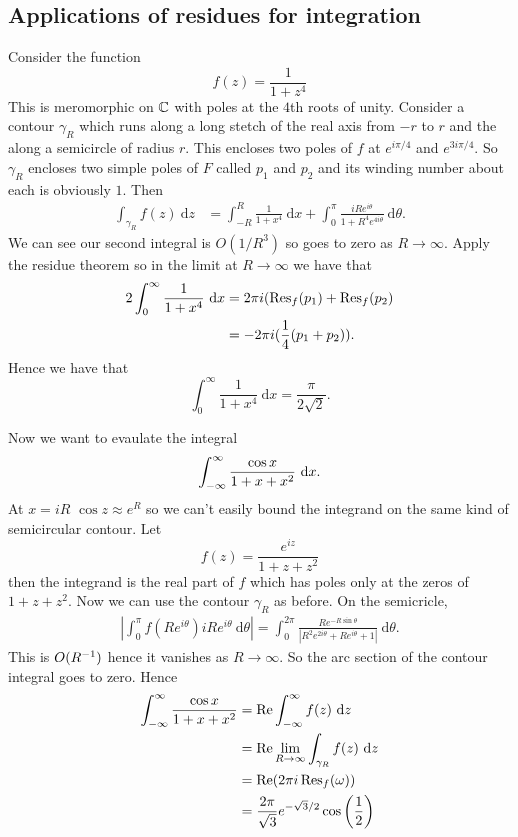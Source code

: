 \documentclass{article}
\begin{document}
\subsection{Applications of residues for integration}
\begin{example}
  Consider the function
  \[
	  f(z) = \frac 1{1+z^4}
  \]
  This is meromorphic on $ \mathbb{C} $ with poles at the $ 4 $th roots of unity. Consider a contour $ \gamma_R $ which runs along a long stetch of the real axis from $ -r $ to $ r $ and the along a semicircle of radius $ r $. This encloses two poles of $ f $ at $ e^{i\pi/4} $ and $ e^{3i\pi/4} $. So $ \gamma_R $ encloses two simple poles of $ F $ called $ p_1 $ and $ p_2 $ and its winding number about each is obviously $ 1 $. Then
  \begin{align*}
	  \int_{\gamma_R} f(z)\ \mathrm dz &= \int_{-R}^R \frac 1{1+x^4}\ \mathrm dx + \int_0^\pi \frac{iRe^{i\theta}}{1+R^4e^{4i\theta}} \ \mathrm d\theta.
  \end{align*}
  We can see our second integral is $ O(1/R^3) $ so goes to zero as $ R\to\infty $. Apply the residue theorem so in the limit at $ R\to\infty $ we have that
  \begin{align*}
	  2\int_0^\infty \frac 1{1+x^4}  \ \mathrm dx  &= 2\pi i (\Res_f(p_1) + \Res_f(p_2) \\
						       &= -2\pi i(\frac 14(p_1 + p_2)).
  \end{align*}
  Hence we have that
  \[
	  \int_0^\infty \frac 1{1+x^4} \ \mathrm dx = \frac{\pi}{2\sqrt 2}.
  \]
\end{example}
\begin{example}
  Now we want to evaulate the integral
  \[
	  \int_{-\infty}^\infty \frac{\cos x}{1+x+x^2}\ \mathrm dx.
  \]
  At $ x = iR $ $ \cos z\approx e^R $ so we can't easily bound the integrand on the same kind of semicircular contour. Let
  \[
	  f(z) = \frac{e^{iz}}{1+z+z^2}
  \]
  then the integrand is the real part of $ f $ which has poles only at the zeros of $ 1+z+z^2 $. Now we can use the contour $ \gamma_R $ as before. On the semicricle,
  \begin{align*}
	  \left|\int_0^\pi f(Re^{i\theta}) i Re^{i\theta}\ \mathrm d\theta\right|  = \int_0^{2\pi}\frac{Re^{-R\sin\theta}}{|R^2e^{2i\theta}+Re^{i\theta}+1|} \ \mathrm d\theta.
  \end{align*}
  This is $ O({R}^{-1}) $ hence it vanishes as $ R\to\infty $. So the arc section of the contour integral goes to zero. Hence
  \begin{align*}
	  \allint \frac{\cos x}{1+x+x^2} &= \Re \allint f(z) \ \mathrm dz \\
					 &= \Re\lim_{R\to\infty} \int_{\gamma_R} f(z) \ \mathrm dz \\
					 &= \Re(2\pi i \Res_f(\omega)) \\
					 &= \frac{2\pi}{\sqrt 3} e^{-\sqrt 3/2}\cos\left(\frac12\right)
  \end{align*}
\end{example}
\end{document}
